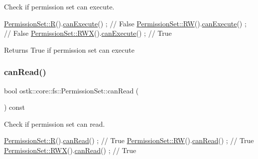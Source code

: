Check if permission set can execute. 


\begin{DoxyCode}
\hyperlink{classostk_1_1core_1_1fs_1_1_permission_set_a400f8be607966c0a42597f5cef062210}{PermissionSet::R}().\hyperlink{classostk_1_1core_1_1fs_1_1_permission_set_a33e094a77d4f4fc9bce629a752831263}{canExecute}() ; \textcolor{comment}{// False}
\hyperlink{classostk_1_1core_1_1fs_1_1_permission_set_ad58bc0911ca89d3c03c089f1647d0315}{PermissionSet::RW}().\hyperlink{classostk_1_1core_1_1fs_1_1_permission_set_a33e094a77d4f4fc9bce629a752831263}{canExecute}() ; \textcolor{comment}{// False}
\hyperlink{classostk_1_1core_1_1fs_1_1_permission_set_a9298592527e35edb785430f03e83e79f}{PermissionSet::RWX}().\hyperlink{classostk_1_1core_1_1fs_1_1_permission_set_a33e094a77d4f4fc9bce629a752831263}{canExecute}() ; \textcolor{comment}{// True}
\end{DoxyCode}


\begin{DoxyReturn}{Returns}
True if permission set can execute 
\end{DoxyReturn}
\mbox{\label{classostk_1_1core_1_1fs_1_1_permission_set_a7c1a83ccca63a9a45c25d0d007ccbfae}} 
\subsubsection{\texorpdfstring{can\+Read()}{canRead()}}
{\footnotesize\ttfamily bool ostk\+::core\+::fs\+::\+Permission\+Set\+::can\+Read (\begin{DoxyParamCaption}{ }\end{DoxyParamCaption}) const}



Check if permission set can read. 


\begin{DoxyCode}
\hyperlink{classostk_1_1core_1_1fs_1_1_permission_set_a400f8be607966c0a42597f5cef062210}{PermissionSet::R}().\hyperlink{classostk_1_1core_1_1fs_1_1_permission_set_a7c1a83ccca63a9a45c25d0d007ccbfae}{canRead}() ; \textcolor{comment}{// True}
\hyperlink{classostk_1_1core_1_1fs_1_1_permission_set_ad58bc0911ca89d3c03c089f1647d0315}{PermissionSet::RW}().\hyperlink{classostk_1_1core_1_1fs_1_1_permission_set_a7c1a83ccca63a9a45c25d0d007ccbfae}{canRead}() ; \textcolor{comment}{// True}
\hyperlink{classostk_1_1core_1_1fs_1_1_permission_set_a9298592527e35edb785430f03e83e79f}{PermissionSet::RWX}().\hyperlink{classostk_1_1core_1_1fs_1_1_permission_set_a7c1a83ccca63a9a45c25d0d007ccbfae}{canRead}() ; \textcolor{comment}{// True}
\end{DoxyCode}



